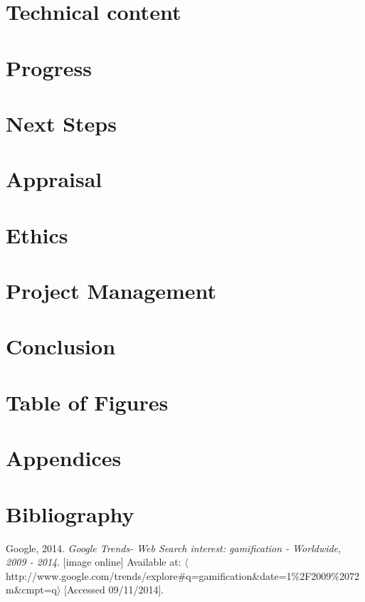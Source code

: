 \documentclass[10pt,a4paper]{report}
\begin{document}
\section*{Technical content}
\section*{Progress}
\section*{Next Steps}
\section*{Appraisal}
\section*{Ethics}
\section*{Project Management}
\section*{Conclusion}
\section*{Table of Figures}
\listoffigures
\section*{Appendices}
\section*{Bibliography}
Google, 2014. \textit{Google Trends- Web Search interest: gamification - Worldwide, 2009 - 2014}. [image online] Available at: $\langle$http://www.google.com/trends/explore\#q=gamification\&date=1\%2F2009\%2072m\&cmpt=q$\rangle$ [Accessed 09/11/2014].
\end{document}
